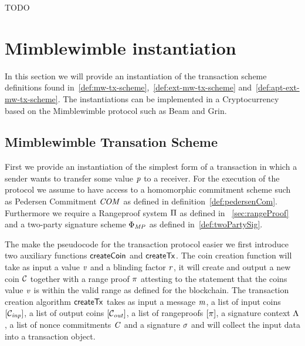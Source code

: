 \begin{definition}
    TODO
\end{definition}


\section{Mimblewimble instantiation}\label{sec:atomic-inst}

In this section we will provide an instantiation of the transaction scheme definitions found in~\ref{def:mw-tx-scheme},~\ref{def:ext-mw-tx-scheme} and~\ref{def:apt-ext-mw-tx-scheme}. The instantiations can be
implemented in a Cryptocurrency based on the Mimblewimble protocol such as Beam and Grin.

\subsection{Mimblewimble Transation Scheme}

First we provide an instantiation of the simplest form of a transaction in which a sender wants to transfer some value $\mathit{p}$ to a receiver. For the execution of the protocol we assume to have access to a homomorphic
commitment scheme such as Pedersen Commitment $\mathit{COM}$ as defined in definition~\ref{def:pedersenCom}. Furthermore we require a Rangeproof system $\Pi$ as defined in
~\ref{sec:rangeProof} and a two-party signature scheme $\Phi_{\mathit{MP}}$ as defined in~\ref{def:twoPartySig}.

The make the pseudocode for the transaction protocol easier we first introduce two auxiliary functions $\mathsf{createCoin}$
and $\mathsf{createTx}$. The coin creation function will take as input a value $\mathit{v}$ and a blinding factor $\mathit{r}$, it will create and output a new coin $\mathcal{C}$ together with a range proof
$\pi$ attesting to the statement that the coins value $\mathit{v}$ is within the valid range as defined for the blockchain.
The transaction creation algorithm $\mathsf{createTx}$ takes as input a message $\mathit{m}$, a list of input coins $[\mathcal{C}_{\mathit{inp}}]$, a list of output coins $[\mathcal{C}_{\mathit{out}}]$, a list of rangeproofs
$[\pi]$, a signature context $\Lambda$, a list of nonce commitments $\mathit{C}$ and a signature $\sigma$ and will collect the input data into a transaction object.

